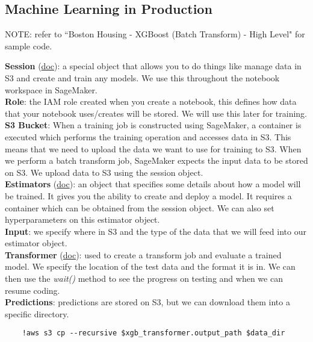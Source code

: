\documentclass[11pt, a4paper]{article}
\begin{document}
\begin{spacing}{1.1}
	\subsection{Machine Learning in Production}
	\begin{center}
	\color{darkgray} NOTE: refer to ``Boston Housing - XGBoost (Batch Transform) - High Level" for sample code. \color{black}
	\end{center}
	\textbf{Session} (\href{https://sagemaker.readthedocs.io/en/latest/session.html}{doc}): a special object that allows you to do things like manage data in S3 and create and train any models. We use this throughout the notebook workspace in SageMaker. \vspace*{2mm}\\
	\textbf{Role}: the IAM role created when you create a notebook, this defines how data that your notebook uses/creates will be stored. We will use this later for training. \vspace*{2mm}\\
	\textbf{S3 Bucket}: When a training job is constructed using SageMaker, a container is executed which performs the training operation and accesses data in S3. This means that we need to upload the data we want to use for training to S3. When we perform a batch transform job, SageMaker expects the input data to be stored on S3. We upload data to S3 using the session object.\vspace*{2mm}\\
	\textbf{Estimators} (\href{https://sagemaker.readthedocs.io/en/latest/estimators.html}{doc}): an object that specifies some details about how a model will be trained. It gives you the ability to create and deploy a model. It requires a container which can be obtained from the session object. We can also set hyperparameters on this estimator object. \vspace*{2mm}\\
	\textbf{Input}: we specify where in S3 and the type of the data that we will feed into our estimator object. \vspace*{2mm}\\
	\textbf{Transformer} (\href{https://sagemaker.readthedocs.io/en/latest/transformer.html}{doc}): used to create a transform job and evaluate a trained model. We specify the location of the test data and the format it is in. We can then use the \textit{wait()} method to see the progress on testing and when we can resume coding. \vspace*{2mm}\\
	\textbf{Predictions}: predictions are stored on S3, but we can download them into a specific directory. 
	\begin{lstlisting}
	!aws s3 cp --recursive $xgb_transformer.output_path $data_dir
	\end{lstlisting} \newpage

	
	
	
	
	
	
	
	
	
	
\end{spacing}
\end{document}
